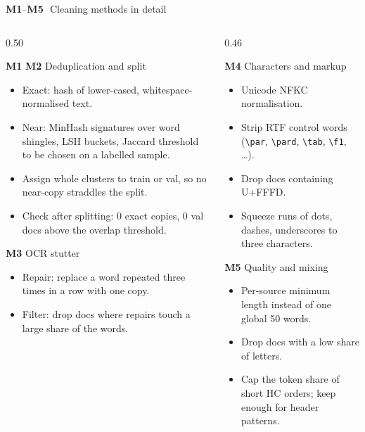 \documentclass[aspectratio=169,11pt]{beamer}
\newcommand{\code}[1]{\texttt{\small #1}}
\newcommand{\bs}{\textbackslash}
\newcommand{\mt}[1]{\textbf{\textcolor{aqua!80!black}{#1}}} %
\begin{document}
\begin{frame}{\mt{M1}--\mt{M5}\,\, Cleaning methods in detail}
  \begin{columns}[T]
    \begin{column}{0.50\textwidth}
      \scriptsize
      \begin{block}{\mt{M1} \mt{M2} Deduplication and split}
        \begin{itemize}
          \item Exact: hash of lower-cased, whitespace-normalised text.
          \item Near: MinHash signatures over word shingles, LSH buckets, Jaccard threshold to be chosen on a labelled sample.
          \item Assign whole clusters to train or val, so no near-copy straddles the split.
          \item Check after splitting: 0 exact copies, 0 val docs above the overlap threshold.
        \end{itemize}
      \end{block}
      \begin{block}{\mt{M3} OCR stutter}
        \begin{itemize}
          \item Repair: replace a word repeated three times in a row with one copy.
          \item Filter: drop docs where repairs touch a large share of the words.
        \end{itemize}
      \end{block}
    \end{column}
    \begin{column}{0.46\textwidth}
      \scriptsize
      \begin{block}{\mt{M4} Characters and markup}
        \begin{itemize}
          \item Unicode NFKC normalisation.
          \item Strip RTF control words (\code{\bs par}, \code{\bs pard}, \code{\bs tab}, \code{\bs f1}, \ldots).
          \item Drop docs containing U+FFFD.
          \item Squeeze runs of dots, dashes, underscores to three characters.
        \end{itemize}
      \end{block}
      \begin{block}{\mt{M5} Quality and mixing}
        \begin{itemize}
          \item Per-source minimum length instead of one global 50 words.
          \item Drop docs with a low share of letters.
          \item Cap the token share of short HC orders; keep enough for header patterns.
        \end{itemize}
      \end{block}
    \end{column}
  \end{columns}
\end{frame}
\end{document}
